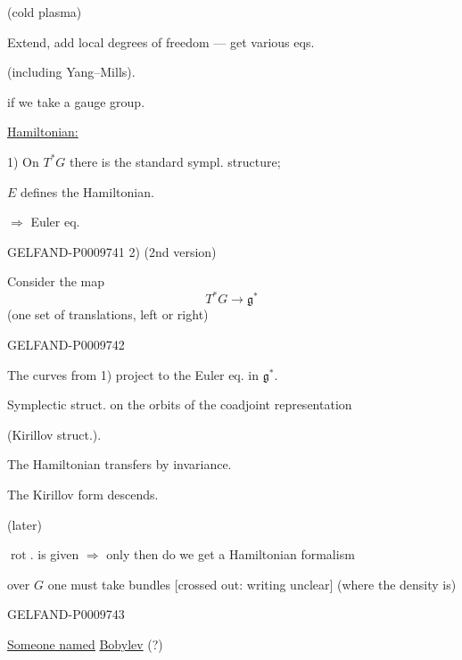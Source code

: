 \quad{}

(cold plasma)

Extend, add local degrees of freedom --- get various eqs.

(including Yang–Mills).

if we take a gauge group.

\underline{Hamiltonian:}

1) On $T^*G$ there is the standard sympl. structure;

$E$ defines the Hamiltonian.

$\Rightarrow$ Euler eq.

\begin{GelfandAdjacentEvidence}{GELFAND-P000974}{1}
2) (2nd version)

Consider the map
\[
 T^*G\longrightarrow\mathfrak g^*
\]
(one set of translations, left or right)
\end{GelfandAdjacentEvidence}
\begin{GelfandAdjacentEvidence}{GELFAND-P000974}{2}


The curves from 1) project to the Euler eq. in $\mathfrak g^*$.

Symplectic struct. on the orbits of the coadjoint representation

(Kirillov struct.).

The Hamiltonian transfers by invariance.

The Kirillov form descends.

\quad{}\quad (later)

$\operatorname{rot}$. is given $\Rightarrow$ only then do we get a Hamiltonian formalism

over $G$ one must take bundles [crossed out: writing unclear] (where the density is)
\end{GelfandAdjacentEvidence}
\begin{GelfandAdjacentEvidence}{GELFAND-P000974}{3}


\underline{\underline{Someone named}} \underline{Bobylev} (?)
\end{GelfandAdjacentEvidence}
